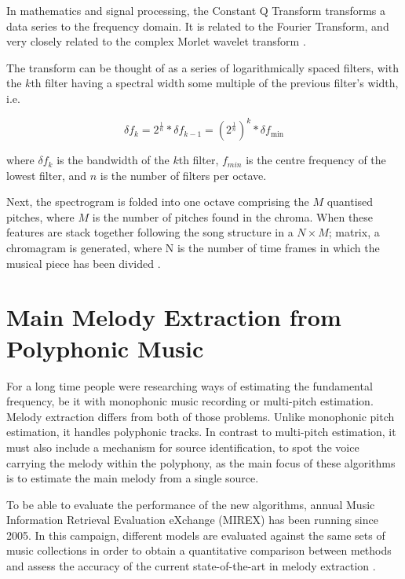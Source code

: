 In mathematics and signal processing, the Constant Q Transform transforms a data series to the frequency domain. It is related to the Fourier Transform, and very closely related to the complex Morlet wavelet transform \cite{wavelet}. 

The transform can be thought of as a series of logarithmically spaced filters, with the $k$th filter having a spectral width some multiple of the previous filter's width, i.e.

\begin{equation}
\delta f_k = 2^{ \frac {1}{n} } * \delta f_{k-1} = \left ( {2^{ \frac {1}{n} }} \right )^{k} * \delta f_{\mathrm{min}}
\end{equation}

where $\delta f_{k}$ is the bandwidth of the $k$th filter, $f_{min}$ is the centre frequency of the lowest filter, and $n$ is the number of filters per octave.

Next, the spectrogram is folded into one octave comprising the $M$ quantised pitches, where $M$ is the number of pitches found in the chroma. When these features are stack together following the song structure in a $N \times M$; matrix, a chromagram is generated, where N is the number of time frames in which the musical piece has been divided \cite{constantQ}.

\vspace{20pt}

\section{Main Melody Extraction from Polyphonic Music}
\label{sec:mainmelodybackground}

For a long time people were researching ways of estimating the fundamental frequency, be it with monophonic music recording or multi-pitch estimation. Melody extraction differs from both of those problems. Unlike monophonic pitch estimation, it handles polyphonic tracks. In contrast to multi-pitch estimation, it must also include a mechanism for source identification, to spot the voice carrying the melody within the polyphony, as the main focus of these algorithms is to estimate the main melody from a single source. 

To be able to evaluate the performance of the new algorithms, annual Music Information Retrieval Evaluation eXchange (MIREX) has been running since 2005. In this campaign, different models are evaluated against the same sets of music collections in order to obtain a quantitative comparison between methods and assess the accuracy of the current state-of-the-art in melody extraction \cite{comparison}.

